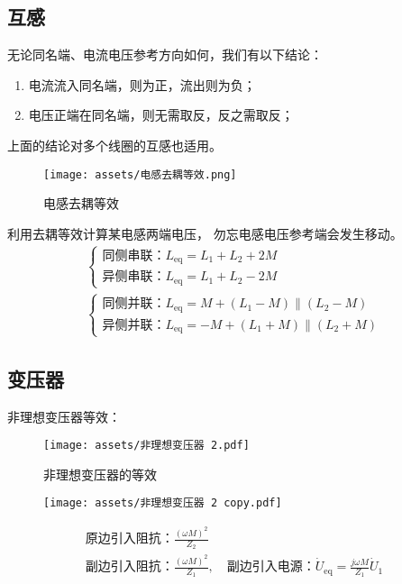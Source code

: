 \documentclass[a4paper]{article}  %
\theoremstyle{MyLineTheoremStyle} %
\theoremstyle{MyBlockTheoremStyle} %
\theoremstyle{MySubsubsectionStyle} %
\begin{document}
\begin{multicols*}{4}
\subsection{互感}

无论同名端、电流电压参考方向如何，我们有以下结论：
\begin{enumerate}
\item 电流流入同名端，则为正，流出则为负；
\item 电压正端在同名端，则无需取反，反之需取反；
\end{enumerate}
上面的结论对多个线圈的互感也适用。

\begin{figure}[H]\centering
    \texttt{[image: assets/电感去耦等效.png]}
    \caption{电感去耦等效}
    \label{电感去耦等效}
\end{figure}

利用去耦等效计算某电感两端电压，{\color{red} 勿忘电感电压参考端会发生移动}。
\begin{gather}
    \begin{cases}
    \text{同侧串联：} L_{\text{eq}} = L_1 + L_2 + 2M \\
    \text{异侧串联：} L_{\text{eq}} = L_1 + L_2 - 2M
    \end{cases} \\
    \begin{cases}
    \text{同侧并联：} L_{\text{eq}} = M + (L_1 - M)\parallel(L_2 - M)\\
    \text{异侧并联：} L_{\text{eq}} = -M + (L_1 + M)\parallel(L_2 + M)
    \end{cases}
\end{gather}

\subsection{变压器}
非理想变压器等效：
\begin{figure}[H]\centering
    \texttt{[image: assets/非理想变压器 2.pdf]}
    \caption{非理想变压器的等效}
    \label{非理想变压器等效}
\end{figure}
\begin{figure}[H]\centering
    \texttt{[image: assets/非理想变压器 2 copy.pdf]}
\end{figure}

\begin{gather}
\text{原边引入阻抗：} \frac{(\omega M)^2}{Z_2} \\
\text{副边引入阻抗：} \frac{(\omega M)^2}{Z_1},\quad 
\text{副边引入电源：} \dot{U}_{\text{eq}} = \frac{j \omega M}{Z_1} \dot{U}_1
\end{gather}


\end{multicols*}
\end{document}
